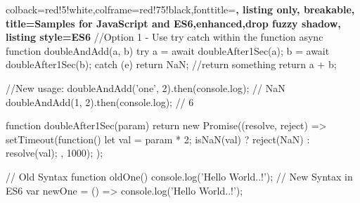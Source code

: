 \documentclass[10pt]{article}
\begin{document}
\kant[1-3]


\begin{tcblisting}{colback=red!5!white,colframe=red!75!black,fonttitle=\bfseries,
		listing only, breakable,
		title=Samples for JavaScript and ES6,enhanced,drop fuzzy shadow,
		listing style=ES6
	}
//Option 1 - Use try catch within the function
async function doubleAndAdd(a, b) {
	try {
		a = await doubleAfter1Sec(a);
		b = await doubleAfter1Sec(b);
	} catch (e) {
		return NaN; //return something
	}
	return a + b;
}

//New usage:
doubleAndAdd('one', 2).then(console.log); // NaN
doubleAndAdd(1, 2).then(console.log); // 6

function doubleAfter1Sec(param) {
	return new Promise((resolve, reject) => {
		setTimeout(function() {
			let val = param * 2;
			isNaN(val) ? reject(NaN) : resolve(val);
		}, 1000);
	});
}


	// Old Syntax
	function oldOne() {
		console.log('Hello World..!');
	}
	// New Syntax in ES6
	var newOne = () => {
		console.log('Hello World..!');
	}
\end{tcblisting}
\end{document}
